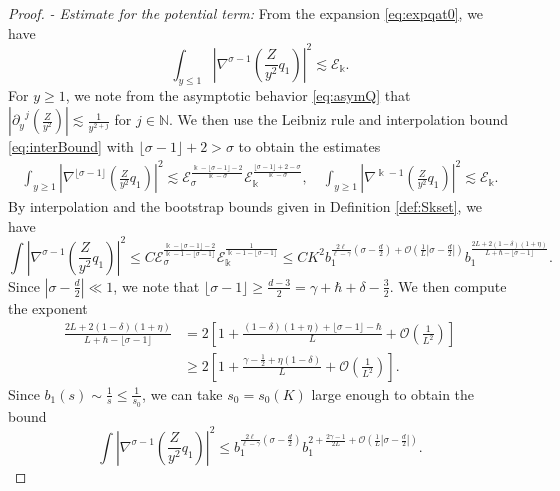 \documentclass[11pt]{aims}
\theoremstyle{definition}
\numberwithin{equation}{section}
\begin{document}
\begin{proof}
\noindent \textit{- Estimate for the potential term:} From the expansion \eqref{eq:expqat0}, we have 
$$\int_{y \leq 1} \left| \nabla^{\sigma - 1}\left(\frac{Z}{y^2}q_1\right) \right|^2 \lesssim {\mathscr{E}}_\Bbbk.$$
For $y \geq 1$, we note from the asymptotic behavior \eqref{eq:asymQ} that $\left|{\partial_y}^j\left(\frac{Z}{y^2}\right)\right| \lesssim \frac{1}{y^{2 + j}}$ for $j \in \mathbb{N}$. We then use the Leibniz rule and interpolation bound \eqref{eq:interBound} with $\lfloor\sigma -1 \rfloor + 2 > \sigma$ to obtain the estimates 
\begin{align*}
\int_{y \geq 1} \left| \nabla^{\lfloor\sigma -1 \rfloor}\left(\frac{Z}{y^2}q_1\right) \right|^2 \lesssim {\mathscr{E}}_\sigma^{\frac{\Bbbk - \lfloor\sigma -1 \rfloor - 2}{\Bbbk - \sigma}} {\mathscr{E}}_\Bbbk^{\frac{\lfloor\sigma -1 \rfloor + 2 - \sigma}{\Bbbk - \sigma}},  \quad \int_{y \geq 1} \left| \nabla^{\Bbbk - 1}\left(\frac{Z}{y^2}q_1\right) \right|^2 \lesssim {\mathscr{E}}_\Bbbk.
\end{align*}
By interpolation and the bootstrap bounds given in Definition \eqref{def:Skset}, we have 
$$\int\left| \nabla^{\sigma - 1}\left(\frac{Z}{y^2}q_1\right) \right|^2 \leq C {\mathscr{E}}_\sigma^{\frac{\Bbbk - \lfloor\sigma -1 \rfloor - 2}{\Bbbk - 1 - \lfloor\sigma -1 \rfloor}}{\mathscr{E}}_\Bbbk^{\frac{1}{\Bbbk - 1 - \lfloor\sigma -1 \rfloor}} \leq C K^2b_1^{\frac{2\ell}{\ell - \gamma}\left(\sigma - \frac d2\right) + {\mathcal{O}}\left(\frac{1}{L}\left|\sigma - \frac d2 \right|\right)}b_1^{\frac{2L + 2(1 - \delta)(1 + \eta)}{L + \hbar - \lfloor\sigma -1 \rfloor}}.$$
Since $\left|\sigma  - \frac d2\right| \ll 1$, we note that $\lfloor\sigma -1 \rfloor \geq \frac{d-3}{2} = \gamma + \hbar + \delta - \frac{3}{2}$. We then compute the exponent 
\begin{align*}
\frac{2L + 2(1 - \delta)(1 + \eta)}{L + \hbar - \lfloor\sigma -1 \rfloor} &= 2 \left[1 + \frac{(1 - \delta)(1 + \eta) + \lfloor\sigma -1 \rfloor - \hbar}{L} + {\mathcal{O}}\left(\frac{1}{L^2}\right) \right]\\
& \geq 2 \left[1 + \frac{\gamma - \frac 12 + \eta(1 - \delta)}{L} + {\mathcal{O}}\left(\frac{1}{L^2}\right) \right].
\end{align*}
Since $b_1(s) \sim \frac{1}{s} \leq \frac{1}{s_0}$, we can take $s_0 = s_0(K)$ large enough to obtain the bound
\begin{equation}\label{est:poEsigma}
\int\left| \nabla^{\sigma - 1}\left(\frac{Z}{y^2}q_1\right) \right|^2 \leq b_1^{\frac{2\ell}{\ell - \gamma}\left(\sigma - \frac d2\right)} b_1^{2 + \frac{2\gamma - 1}{2L} + {\mathcal{O}} \left(\frac{1}{L}\left| \sigma - \frac{d}{2}\right|\right)}.
\end{equation}


\end{proof}
\end{document}
